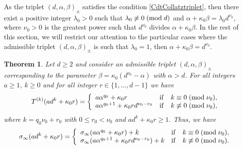 \documentclass[11pt,a4paper]{article}
\newtheorem{theorem}{Theorem}[section]
\newcommand*\modd[3]{#1\equiv#2\;( {\rm mod}\;  #3)}
\newcommand*\notmodd[3]{#1\not\equiv#2\;( {\rm mod}\;  #3)}
\begin{document}
As the triplet $(d,\alpha,\beta)_{\pmb{\pm}}$  satisfies the condition \eqref{CdtCollatztriplet}, then there exist a positive integer $\lambda_0>0$ such that $\notmodd{\lambda_0}{0}{d}$
and 
$\alpha +\kappa_0\beta =\lambda_0d^{\nu_0}$, where $\nu_0>0$ is the greatest power such that $d^{\nu_0}$ divides  $\alpha +\kappa_0\beta$. In the rest of this section, we will restrict our attention to the particular cases where 
the admissible  triplet $(d,\alpha,\beta)_{\pmb{\pm}}$  is such that $\lambda_0=1$, then
$\alpha+\kappa_0\beta =d^{\nu_0}$.


\begin{theorem}
	Let $d\geq 2$ and consider     an admissible triplet  $(d,\alpha,\beta)_{\pmb{\pm}}$  corresponding to   the parameter   $\beta =\kappa_0(d^{\nu_0}-\alpha)$ with $\alpha>d$.  For all integers $a\geq 1$, $k\geq 0$ and for all integer $r\in\{1,\ldots,d-1\}$ we have 
	\begin{equation}\label{T(adk+kappa0 r)-casgenral_4.2}
		T^{(k)}(ad^k+\kappa_0 r)=\left\{\begin{array}{lll}
			a\alpha^{q_0}+\kappa_0 r&\mathrm{if}& \modd{k}{0}{\nu_0},\\
			a\alpha^{q_0+1}+\kappa_0 r d^{\nu_0-r_0}&\mathrm{if}& \notmodd{k}{0}{\nu_0},\\
		\end{array}\right.
	\end{equation}
	where $ k=q_0\nu_0+r_0$ with $0\leq r_0< \nu_0$  and $ad^k+\kappa_0 r\geq 1$.  Thus, we have
	\begin{equation}\label{sigmainf(adk+kappa0 r)-casgenral}
		\sigma_\infty(ad^k+\kappa_0 r)=\left\{\begin{array}{lll}
			\sigma_\infty(a\alpha^{q_0}+\kappa_0 r)+k&\mathrm{if}& \modd{k}{0}{\nu_0},\\
			\sigma_\infty(a\alpha^{q_0+1}+\kappa_0 r d^{\nu_0-r_0})+k&\mathrm{if}& \notmodd{k}{0}{\nu_0}.\\
		\end{array}\right.
	\end{equation}
\end{theorem}
\end{document}
